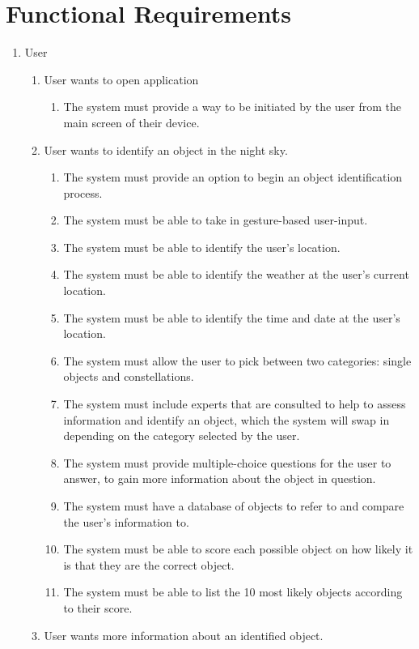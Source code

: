 \documentclass[]{article}
\begin{document}
\section{Functional Requirements}
\label{sec:functional_requirements}
\begin{enumerate}[{VP}1.]
	\item User
	\begin{enumerate}[{BE1}.1]
		\item User wants to open application
		\begin{enumerate}
			\item The system must provide a way to be initiated by the user from the main screen of their device.
		\end{enumerate}
		\item User wants to identify an object in the night sky.
		\begin{enumerate}
		    \item The system must provide an option to begin an object identification process.
		    \item The system must be able to take in gesture-based user-input.
			\item The system must be able to identify the user's location.
			\item The system must be able to identify the weather at the user's current location.
			\item The system must be able to identify the time and date at the user's location.
			\item The system must allow the user to pick between two categories: single objects and constellations.
			\item The system must include experts that are consulted to help to assess information and identify an object, which the system will swap in depending on the category selected by the user.
			\item The system must provide multiple-choice questions for the user to answer, to gain more information about the object in question.
			\item The system must have a database of objects to refer to and compare the user's information to.
			\item The system must be able to score each possible object on how likely it is that they are the correct object.
			\item The system must be able to list the 10 most likely objects according to their score.
		\end{enumerate}
		\item User wants more information about an identified object.

\end{enumerate}
\end{enumerate}
\end{document}
